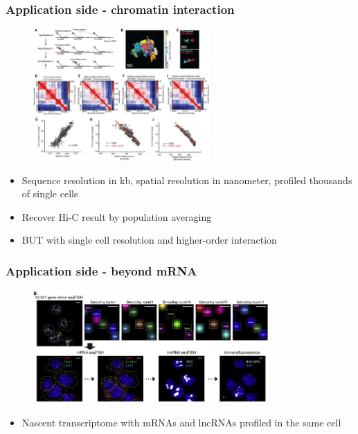 \documentclass{beamer}
\begin{document}
  \begin{frame}
  \frametitle{Application side - chromatin interaction}
  \begin{figure}
    \centering
    \includegraphics[width=0.6\textwidth]{chromatin}
    \cite{bintu2018super}
  \end{figure}
  \begin{itemize}
    \item Sequence resolution in kb, spatial resolution in nanometer, profiled thousands of single cells
    \item Recover Hi-C result by population averaging
    \item BUT with single cell resolution and higher-order interaction
  \end{itemize}
  \end{frame}

  \begin{frame}
  \frametitle{Application side - beyond mRNA}
  \begin{figure}
    \centering
    \includegraphics[width=0.8\textwidth]{gr1}
    \cite{shah2018dynamics}
  \end{figure}
  \begin{itemize}
    \item Nascent transcriptome with mRNAs and lncRNAs profiled in the same cell
  \end{itemize}
  \end{frame}
\end{document}
